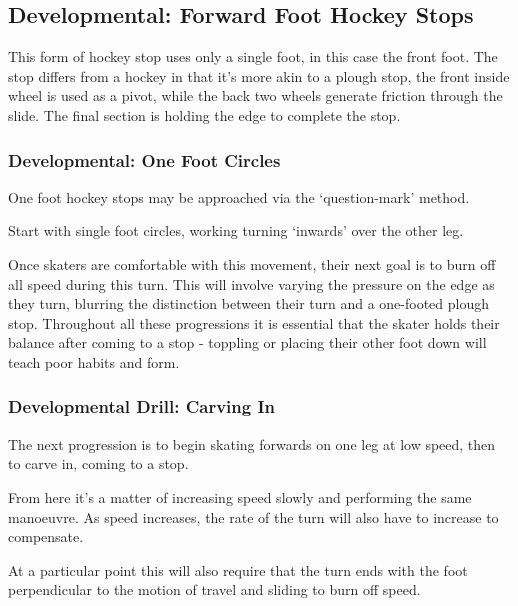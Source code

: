 \subsection{Developmental: Forward Foot Hockey Stops}

This form of hockey stop uses only a single foot, in this case the front foot. 
The stop differs from a hockey in that it's more akin to a plough stop, the front inside wheel is used as a pivot, while the back two wheels generate friction through the slide.
The final section is holding the edge to complete the stop. 



\subsubsection{Developmental: One Foot Circles}
One foot hockey stops may be approached via the `question-mark' method.

Start with single foot circles, working turning `inwards' over the other leg.

Once skaters are comfortable with this movement, their next goal is to burn off all speed during this turn.
This will involve varying the pressure on the edge as they turn, blurring the distinction between their turn and a one-footed plough stop.
Throughout all these progressions it is essential that the skater holds their balance after coming to a stop - toppling or placing their other foot down will teach poor habits and form.  


\subsubsection{Developmental Drill: Carving In}

The next progression is to begin skating forwards on one leg at low speed, then to carve in, coming to a stop. 

From here it's a matter of increasing speed slowly and performing the same manoeuvre.
As speed increases, the rate of the turn will also have to increase to compensate.

At a particular point this will also require that the turn ends with the foot perpendicular to the motion of travel and sliding to burn off speed. 


